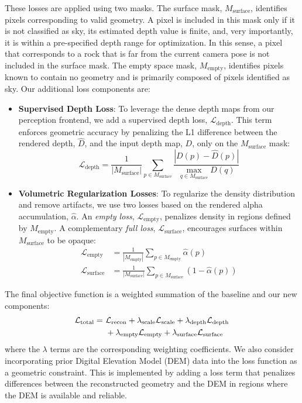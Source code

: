 These losses are applied using two masks. The surface mask, $M_{\text{surface}}$, identifies pixels corresponding to valid geometry. A pixel is included in this mask only if it is not classified as sky, its estimated depth value is finite, and, very importantly, it is within a pre-specified depth range for optimization.
In this sense, a pixel that corresponds to a rock that is far from the current camera pose is not included in the surface mask.
The empty space mask, $M_{\text{empty}}$, identifies pixels known to contain no geometry and is primarily composed of pixels identified as sky.
Our additional loss components are:
\begin{itemize}
	\item \textbf{Supervised Depth Loss}: To leverage the dense depth maps from our perception frontend, we add a supervised depth loss, $\mathcal{L}_{\text{depth}}$. This term enforces geometric accuracy by penalizing the L1 difference between the rendered depth, $\hat{D}$, and the input depth map, $D$, only on the $M_{\text{surface}}$ mask:
	      \begin{equation}
		      \mathcal{L}_{\text{depth}} = \frac{1}{|M_{\text{surface}}|} \sum_{p \in M_{\text{surface}}} \frac{|D(p) - \hat{D}(p)|}{\max_{q \in M_{\text{surface}}} D(q)}
	      \end{equation}

	\item \textbf{Volumetric Regularization Losses}: To regularize the density distribution and remove artifacts, we use two losses based on the rendered alpha accumulation, $\hat{\alpha}$. An \textit{empty loss}, $\mathcal{L}_{\text{empty}}$, penalizes density in regions defined by $M_{\text{empty}}$. A complementary \textit{full loss}, $\mathcal{L}_{\text{surface}}$, encourages surfaces within $M_{\text{surface}}$ to be opaque:
	      \begin{align}
		      \mathcal{L}_{\text{empty}}   & = \frac{1}{|M_{\text{empty}}|} \sum_{p \in M_{\text{empty}}} \hat{\alpha}(p)           \\
		      \mathcal{L}_{\text{surface}} & = \frac{1}{|M_{\text{surface}}|} \sum_{p \in M_{\text{surface}}} (1 - \hat{\alpha}(p))
	      \end{align}
\end{itemize}

The final objective function is a weighted summation of the baseline and our new components:
\begin{align}
	\mathcal{L}_{\text{total}} =\  & \mathcal{L}_{\text{recon}} + \lambda_{\text{scale}}\mathcal{L}_{\text{scale}} + \lambda_{\text{depth}}\mathcal{L}_{\text{depth}} \notag \\
	                               & + \lambda_{\text{empty}}\mathcal{L}_{\text{empty}} + \lambda_{\text{surface}}\mathcal{L}_{\text{surface}}
\end{align}
where the $\lambda$ terms are the corresponding weighting coefficients.
We also consider incorporating prior Digital Elevation Model (DEM) data into the loss function as a geometric constraint. This is implemented by adding a loss term that penalizes differences between the reconstructed geometry and the DEM in regions where the DEM is available and reliable.